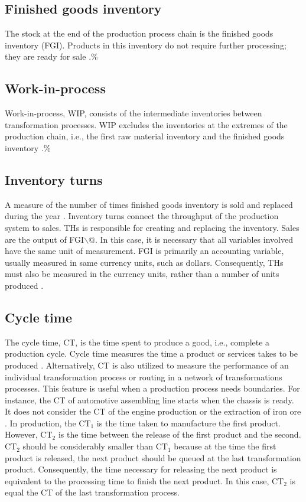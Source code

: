 \documentclass{article}
\begin{document}
\subsection{Finished goods inventory}

The stock at the end of the production process chain is the finished goods inventory (FGI).
Products in this inventory do not require further processing; they are ready for sale \citep{Hopp2001}.\%\citep[p.217]{Hopp2001}

\subsection{Work-in-process}

Work-in-process, WIP, consists of the intermediate inventories between transformation processes.
WIP excludes the inventories at the extremes of the production chain, i.e., the first raw material inventory and the finished goods inventory \citep{Hopp2001}.\%\citep[p.217]{Hopp2001}

\subsection{Inventory turns}

A measure of the number of times finished goods inventory is sold and replaced during the year \citep{Marshall2014}.
Inventory turns connect the throughput of the production system to sales.
THs is responsible for creating and replacing the inventory.
Sales are the output of FGI$\backslash$@.
In this case, it is necessary that all variables involved have the same unit of measurement.
FGI is primarily an accounting variable, usually measured in same currency units, such as dollars.
Consequently,
THs must also be measured in the currency units, rather than a number of units produced \citep{Hopp2001}.

\subsection{Cycle time}

The cycle time, CT, is the time spent to produce a good, i.e., complete a production cycle.
Cycle time measures the time a product or services takes to be produced \citep{Hopp2001}.
Alternatively, CT is also utilized to measure the performance of an individual transformation process or routing in a network of transformations processes.
This feature is useful when a production process needs boundaries.
For instance, the CT of automotive assembling line starts when the chassis is ready.
It does not consider the CT of the engine production or the extraction of iron ore \citep{Hopp2001}.
In production, the \(\mbox{CT}_1\) is the time taken to manufacture the first product.
However, \(\mbox{CT}_2\) is the time between the release of the first product and the second.
\(\mbox{CT}_2\) should be considerably smaller than \(\mbox{CT}_1\) because at the time the first product is released, the next product should be queued at the last transformation product.
Consequently, the time necessary for releasing the next product is equivalent to the processing time to finish the next product.
In this case, \(\mbox{CT}_2\) is equal the CT of the last transformation process.
\end{document}
